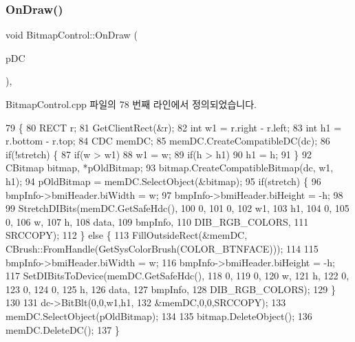 \subsubsection{\texorpdfstring{On\+Draw()}{OnDraw()}}
{\footnotesize\ttfamily void Bitmap\+Control\+::\+On\+Draw (\begin{DoxyParamCaption}\item[{C\+DC $\ast$}]{p\+DC }\end{DoxyParamCaption})\hspace{0.3cm}{\ttfamily [protected]}, {\ttfamily [virtual]}}



Bitmap\+Control.\+cpp 파일의 78 번째 라인에서 정의되었습니다.


\begin{DoxyCode}
79 \{
80   RECT r;
81   GetClientRect(&r);
82   \textcolor{keywordtype}{int} w1 = r.right - r.left;
83   \textcolor{keywordtype}{int} h1 = r.bottom - r.top;
84   CDC memDC;
85   memDC.CreateCompatibleDC(dc);
86   \textcolor{keywordflow}{if}(!stretch) \{
87     \textcolor{keywordflow}{if}(w > w1)
88       w1 = w;
89     \textcolor{keywordflow}{if}(h > h1)
90       h1 = h;
91   \}
92   CBitmap bitmap, *pOldBitmap;
93   bitmap.CreateCompatibleBitmap(dc, w1, h1);
94   pOldBitmap = memDC.SelectObject(&bitmap);
95   \textcolor{keywordflow}{if}(stretch) \{
96     bmpInfo->bmiHeader.biWidth = w;
97     bmpInfo->bmiHeader.biHeight = -h;
98     
99     StretchDIBits(memDC.GetSafeHdc(),
100                   0,
101                   0,
102                   w1,
103                   h1, 
104                   0,
105                   0,
106                   w,
107                   h,
108                   data,
109                   bmpInfo,
110                   DIB\_RGB\_COLORS,
111                   SRCCOPY);
112   \} \textcolor{keywordflow}{else} \{
113     FillOutsideRect(&memDC, CBrush::FromHandle(GetSysColorBrush(COLOR\_BTNFACE)));
114     
115     bmpInfo->bmiHeader.biWidth = w;
116     bmpInfo->bmiHeader.biHeight = -h;
117     SetDIBitsToDevice(memDC.GetSafeHdc(),
118                       0,
119                       0,
120                       w,
121                       h,
122                       0,
123                       0,
124                       0,
125                       h,
126                       data,
127                       bmpInfo,
128                       DIB\_RGB\_COLORS);
129   \}
130 
131   dc->BitBlt(0,0,w1,h1,
132              &memDC,0,0,SRCCOPY);
133   memDC.SelectObject(pOldBitmap);
134 
135   bitmap.DeleteObject();
136   memDC.DeleteDC();  
137 \}
\end{DoxyCode}
\mbox{\label{class_bitmap_control_aea73d6e790bb4828eb230c3cd66e5e0b}} 
